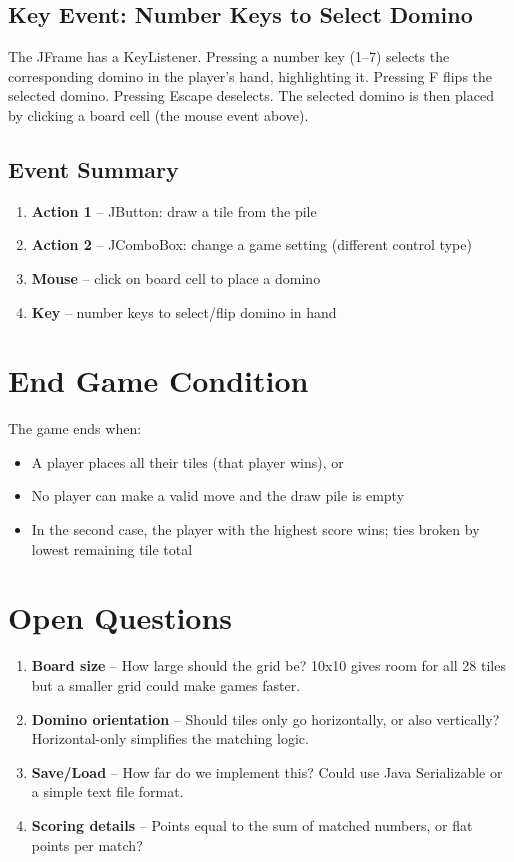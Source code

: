 \documentclass[11pt,a4paper]{article}
\begin{document}
\subsection{Key Event: Number Keys to Select Domino}

The JFrame has a KeyListener. Pressing a number key (1--7) selects the corresponding domino in the player's hand, highlighting it. Pressing F flips the selected domino. Pressing Escape deselects. The selected domino is then placed by clicking a board cell (the mouse event above).

\subsection{Event Summary}

\begin{enumerate}[nosep]
  \item \textbf{Action 1} -- JButton: draw a tile from the pile
  \item \textbf{Action 2} -- JComboBox: change a game setting (different control type)
  \item \textbf{Mouse} -- click on board cell to place a domino
  \item \textbf{Key} -- number keys to select/flip domino in hand
\end{enumerate}

\section{End Game Condition}

The game ends when:
\begin{itemize}[nosep]
  \item A player places all their tiles (that player wins), or
  \item No player can make a valid move and the draw pile is empty
  \item In the second case, the player with the highest score wins; ties broken by lowest remaining tile total
\end{itemize}

\section{Open Questions}

\begin{enumerate}
  \item \textbf{Board size} -- How large should the grid be? 10x10 gives room for all 28 tiles but a smaller grid could make games faster.
  \item \textbf{Domino orientation} -- Should tiles only go horizontally, or also vertically? Horizontal-only simplifies the matching logic.
  \item \textbf{Save/Load} -- How far do we implement this? Could use Java Serializable or a simple text file format.
  \item \textbf{Scoring details} -- Points equal to the sum of matched numbers, or flat points per match?
\end{enumerate}
\end{document}

